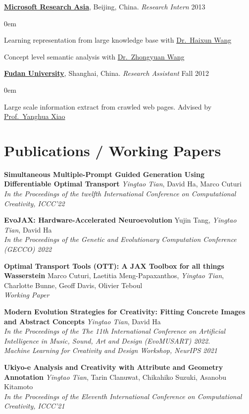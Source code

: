 \documentclass[line,margin]{cv}
\newenvironment{block}
{
	\begin{addmargin}[2em]{0em}%
}
{
	\end{addmargin}
}
\newcommand{\Fudan}{\href{http://www.fudan.edu.cn/englishnew/}{Fudan University}}
\newcommand{\MSRA}{\href{http://research.microsoft.com/en-us/labs/asia/default.aspx}{Microsoft Research Asia}}
\newcommand{\Haixun}{\href{http://haixun.olidu.com/}{Dr.\ Haixun Wang}}
\newcommand{\Zhongyuan}{\href{http://www.wangzhongyuan.com/}{Dr.\ Zhongyuan Wang}}
\newcommand{\Yanghua}{\href{http://gdm.fudan.edu.cn/GDMWiki/Wiki.jsp?page=Yanghuaxiao}{Prof.\ Yanghua Xiao}}
\begin{document}
\begin{resume}
	{\bf \MSRA}, Beijing, China. {\itshape Research Intern} \hfill 2013

	\begin{block}
		Learning representation from large knowledge base with \Haixun

		Concept level semantic analysis with \Zhongyuan
	\end{block}

	{\bf \Fudan}, Shanghai, China. {\itshape Research Assistant} \hfill Fall 2012
	\begin{block}
		Large scale information extract from crawled web pages. Advised by \Yanghua
	\end{block}


\section{Publications / Working Papers}

  {\bf Simultaneous Multiple-Prompt Guided Generation Using Differentiable Optimal Transport}
  \emph{Yingtao Tian}, David Ha, Marco Cuturi\\
  \emph{In the Proceedings of the twelfth International Conference on Computational Creativity, ICCC'22}

  {\bf EvoJAX: Hardware-Accelerated Neuroevolution}
  Yujin Tang, \emph{Yingtao Tian}, David Ha\\
  \emph{In the Proceedings of the Genetic and Evolutionary Computation Conference (GECCO) 2022}

  {\bf Optimal Transport Tools (OTT): A JAX Toolbox for all things Wasserstein}
  Marco Cuturi, Laetitia Meng-Papaxanthos, \emph{Yingtao Tian}, Charlotte Bunne, Geoff Davis, Olivier Teboul\\
  \emph{Working Paper}

  {\bf Modern Evolution Strategies for Creativity: Fitting Concrete Images and Abstract Concepts}
  \emph{Yingtao Tian}, David Ha\\
  \emph{In the Proceedings of the The 11th International Conference on Artificial Intelligence in Music, Sound, Art and Design (EvoMUSART) 2022.\\
  Machine Learning for Creativity and Design Workshop, NeurIPS 2021}

	{\bf  Ukiyo-e Analysis and Creativity with Attribute and Geometry Annotation}
	\emph{Yingtao Tian}, Tarin Clanuwat, Chikahiko Suzuki, Asanobu Kitamoto\\
	\emph{In the Proceedings of the Eleventh International Conference on Computational Creativity, ICCC'21}


\end{resume}
\end{document}
